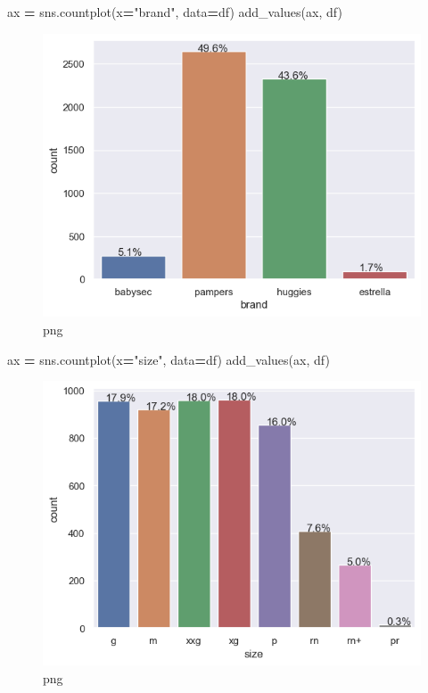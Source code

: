 \documentclass[
]{article}
\newenvironment{Shaded}{\begin{snugshade}}{\end{snugshade}}
\newcommand{\NormalTok}[1]{#1}
\newcommand{\OperatorTok}[1]{\textcolor[rgb]{0.81,0.36,0.00}{\textbf{#1}}}
\newcommand{\StringTok}[1]{\textcolor[rgb]{0.31,0.60,0.02}{#1}}
\begin{document}
\begin{Shaded}
\begin{Highlighting}[]
\NormalTok{ax }\OperatorTok{=}\NormalTok{ sns.countplot(x}\OperatorTok{=}\StringTok{"brand"}\NormalTok{, data}\OperatorTok{=}\NormalTok{df)}
\NormalTok{add\_values(ax, df)}
\end{Highlighting}
\end{Shaded}

\begin{figure}
\centering
\includegraphics{output_7_0.png}
\caption{png}
\end{figure}

\begin{Shaded}
\begin{Highlighting}[]
\NormalTok{ax }\OperatorTok{=}\NormalTok{ sns.countplot(x}\OperatorTok{=}\StringTok{"size"}\NormalTok{, data}\OperatorTok{=}\NormalTok{df)}
\NormalTok{add\_values(ax, df)}
\end{Highlighting}
\end{Shaded}

\begin{figure}
\centering
\includegraphics{output_8_0.png}
\caption{png}
\end{figure}
\end{document}
